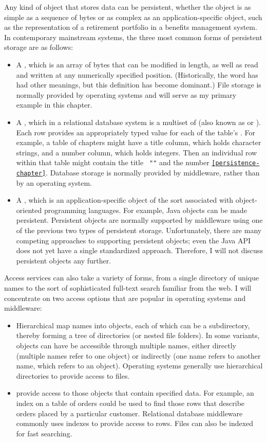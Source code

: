 Any kind of object that stores data can be persistent,
whether the object is as simple as a
sequence of bytes or as complex as an application-specific object,
such as the representation of a retirement portfolio in a benefits
management system.  In contemporary mainstream systems, the three most
common forms of persistent storage are as follows:
\begin{itemize}
\item
A , which is an array of bytes that can be modified in length, as
well as read and written at any numerically specified position.
(Historically, the word has had other meanings, but this definition
has become dominant.)  File storage is normally provided by operating
systems and will serve as my primary example in this chapter.
\item
A , which in a relational database system is a multiset of
 (also known as  or ). Each row provides an
appropriately typed value for each of the table's .
For example, a table of chapters might have a title column, which holds
character strings, and a number column, which holds integers.  Then an
individual row within that table might contain the title {\tt
"\persistenceChapterTitle"} and the number {\tt \ref{persistence-chapter}}.
Database storage is normally provided by middleware, rather than by an
operating system.
\item
A , which is
an application-specific object of the sort associated with
object-oriented programming languages.  For example, Java objects
can be made persistent.  Persistent objects
are normally supported by middleware using one of the previous two
types of persistent storage.  Unfortunately, there are many
competing approaches to supporting persistent objects; even the Java
API does not yet have a single standardized approach.  Therefore, I will not
discuss persistent objects any further.
\end{itemize}

Access services can also take a variety of forms, from a single
directory of unique names to the sort of sophisticated full-text
search familiar from the web.  I will concentrate on two access options
that are popular in operating systems and middleware:
\begin{itemize}
\item
Hierarchical  map names into objects, each of
which can be a subdirectory, thereby forming a tree of directories (or
nested file folders). In some variants, objects can have be accessible
through multiple names, either directly (multiple names refer to one
object) or indirectly (one name refers to another name, which refers
to an object).  Operating systems generally use hierarchical
directories to provide access to files.
\item
{} provide access to those objects that contain specified data.
For example, an index on a table of orders could be used to find those rows
that describe orders placed by a particular customer.  Relational database
middleware commonly uses indexes to provide access to rows.   Files
can also be indexed for fast searching.
\end{itemize}

